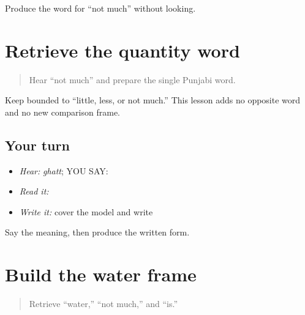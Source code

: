 \begin{tcolorbox}[breakable,colback=teal!4,colframe=teal!35!black,title={Before you move on}]
Produce the word for “not much” without looking.
\end{tcolorbox}
\section[\texorpdfstring{\pa{ਘੱਟ} (ghatt)}{ਘੱਟ (ghatt)}]{Retrieve the quantity word}

\label{lesson:PA-C191-ghatt-review}



\begin{quote}
Hear “not much” and prepare the single Punjabi word.
\end{quote}

\begin{grammarlens}[title={Grammar Lens}]
Keep \textbf{} bounded to “little, less, or not much.” This lesson adds no opposite word and no new comparison frame.
\end{grammarlens}

\subsection*{Your turn}
\begin{itemize}
\raggedright
  \item \emph{Hear:} \emph{ghatt}; YOU SAY: \textbf{}
  \item \emph{Read it:} \textbf{}
  \item \emph{Write it:} cover the model and write \textbf{}
\end{itemize}

\begin{tcolorbox}[breakable,colback=teal!4,colframe=teal!35!black,title={Before you move on}]
Say the meaning, then produce the written form.
\end{tcolorbox}
\section[\texorpdfstring{\pa{ਪਾਣੀ} \pa{ਘੱਟ} \pa{ਹੈ} (paani ghatt hai)}{ਪਾਣੀ ਘੱਟ ਹੈ (paani ghatt hai)}]{Build the water frame}

\label{lesson:PA-C191-paani-ghatt}



\begin{quote}
Retrieve “water,” “not much,” and “is.”
\end{quote}

